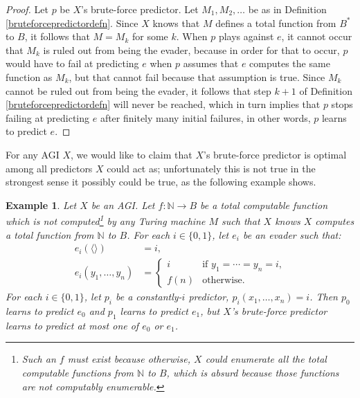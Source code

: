 \documentclass{article}
\newtheorem{example}[theorem]{Example}
\begin{document}
\begin{proof}
    Let $p$ be $X$'s brute-force predictor.
    Let $M_1,M_2,\ldots$ be as in Definition \ref{bruteforcepredictordefn}.
    Since $X$ knows that $M$ defines a total
    function from $B^*$ to $B$,
    it follows that $M=M_k$ for some $k$.
    When $p$ plays against $e$, it cannot occur that $M_k$ is ruled out
    from being the evader, because in order for that to occur, $p$ would have
    to fail at predicting $e$ when $p$ assumes that $e$ computes the same
    function as $M_k$, but that cannot fail because that assumption is true.
    Since $M_k$ cannot be ruled out from being the evader, it follows that
    step $k+1$ of Definition \ref{bruteforcepredictordefn} will never be
    reached, which in turn implies that $p$ stops failing at predicting $e$
    after finitely many initial failures, in other words, $p$ learns to
    predict $e$.
\end{proof}

For any AGI $X$, we would like to claim that $X$'s brute-force predictor is
optimal among all predictors $X$ could act as; unfortunately this
is not true in the strongest sense it possibly could be true, as the following
example shows.

\begin{example}
\label{bruteforcenottotallyoptimalexample}
    Let $X$ be an AGI. Let $f:\mathbb N\to B$ be a total computable function
    which is not computed\footnote{Such an $f$ must exist because
    otherwise, $X$ could enumerate all the total
    computable functions from $\mathbb N$ to $B$, which is absurd because those functions
    are not computably enumerable.} by any Turing machine $M$ such that $X$ knows $X$ computes
    a total function from $\mathbb N$ to $B$.
    For each $i\in\{0,1\}$, let $e_i$ be an evader such that:
    \begin{align*}
        e_i(\langle\rangle) &= i,\\
        e_i(y_1,\ldots,y_n) &=
        \begin{cases}
            i &\mbox{if $y_1=\cdots=y_n=i$,}\\
            f(n) &\mbox{otherwise.}
        \end{cases}
    \end{align*}
    For each $i\in\{0,1\}$, let $p_i$ be a
    constantly-$i$ predictor, $p_i(x_1,\ldots,x_n)=i$.
    Then $p_0$ learns to predict $e_0$ and $p_1$ learns to predict $e_1$,
    but $X$'s brute-force predictor learns to predict at most one of $e_0$ or $e_1$.
\end{example}
\end{document}
